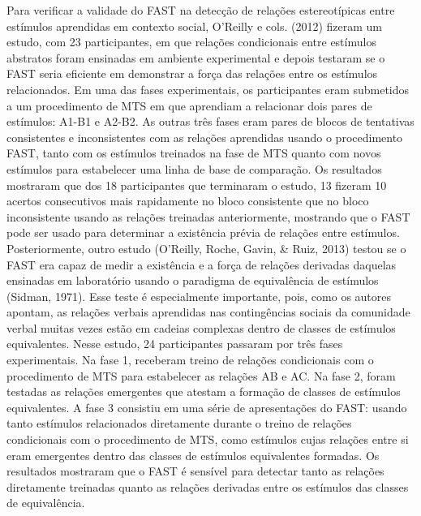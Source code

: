 Para verificar a validade do FAST na detecção de relações estereotípicas entre estímulos aprendidas em contexto social, O'Reilly e cols. (2012) fizeram um estudo, com 23 participantes, em que relações condicionais entre estímulos abstratos foram ensinadas em ambiente experimental e depois testaram se o FAST seria eficiente em demonstrar a força das relações entre os estímulos relacionados. Em uma das fases experimentais, os participantes eram submetidos a um procedimento de MTS em que aprendiam a relacionar dois pares de estímulos: A1-B1 e A2-B2. As outras três fases eram pares de blocos de tentativas consistentes e inconsistentes com as relações aprendidas usando o procedimento FAST, tanto com os estímulos treinados na fase de MTS quanto com novos estímulos para estabelecer uma linha de base de comparação. Os resultados mostraram que dos 18 participantes que terminaram o estudo, 13 fizeram 10 acertos consecutivos mais rapidamente no bloco consistente que no bloco inconsistente usando as relações treinadas anteriormente, mostrando que o FAST pode ser usado para determinar a existência prévia de relações entre estímulos. Posteriormente, outro estudo (O'Reilly, Roche, Gavin, \& Ruiz, 2013) testou se o FAST era capaz de medir a existência e a força de relações derivadas daquelas ensinadas em laboratório usando o paradigma de equivalência de estímulos (Sidman, 1971). Esse teste é especialmente importante, pois, como os autores apontam, as relações verbais aprendidas nas contingências sociais da comunidade verbal muitas vezes estão em cadeias complexas dentro de classes de estímulos equivalentes. Nesse estudo, 24 participantes passaram por três fases experimentais. Na fase 1, receberam treino de relações condicionais com o procedimento de MTS para estabelecer as relações AB e AC. Na fase 2, foram testadas as relações emergentes que atestam a formação de classes de estímulos equivalentes. A fase 3 consistiu em uma série de apresentações do FAST: usando tanto estímulos relacionados diretamente durante o treino de relações condicionais com o procedimento de MTS, como estímulos cujas relações entre si eram emergentes dentro das classes de estímulos equivalentes formadas. Os resultados mostraram que o FAST é sensível para detectar tanto as relações diretamente treinadas quanto as relações derivadas entre os estímulos das classes de equivalência.

